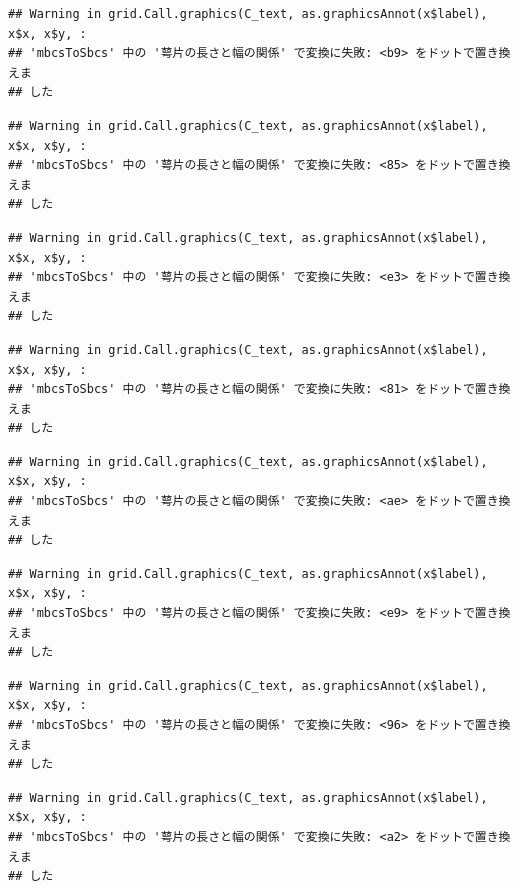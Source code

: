 \documentclass[
]{book}
\begin{document}
\begin{verbatim}
## Warning in grid.Call.graphics(C_text, as.graphicsAnnot(x$label), x$x, x$y, :
## 'mbcsToSbcs' 中の '萼片の長さと幅の関係' で変換に失敗: <b9> をドットで置き換えま
## した
\end{verbatim}

\begin{verbatim}
## Warning in grid.Call.graphics(C_text, as.graphicsAnnot(x$label), x$x, x$y, :
## 'mbcsToSbcs' 中の '萼片の長さと幅の関係' で変換に失敗: <85> をドットで置き換えま
## した
\end{verbatim}

\begin{verbatim}
## Warning in grid.Call.graphics(C_text, as.graphicsAnnot(x$label), x$x, x$y, :
## 'mbcsToSbcs' 中の '萼片の長さと幅の関係' で変換に失敗: <e3> をドットで置き換えま
## した
\end{verbatim}

\begin{verbatim}
## Warning in grid.Call.graphics(C_text, as.graphicsAnnot(x$label), x$x, x$y, :
## 'mbcsToSbcs' 中の '萼片の長さと幅の関係' で変換に失敗: <81> をドットで置き換えま
## した
\end{verbatim}

\begin{verbatim}
## Warning in grid.Call.graphics(C_text, as.graphicsAnnot(x$label), x$x, x$y, :
## 'mbcsToSbcs' 中の '萼片の長さと幅の関係' で変換に失敗: <ae> をドットで置き換えま
## した
\end{verbatim}

\begin{verbatim}
## Warning in grid.Call.graphics(C_text, as.graphicsAnnot(x$label), x$x, x$y, :
## 'mbcsToSbcs' 中の '萼片の長さと幅の関係' で変換に失敗: <e9> をドットで置き換えま
## した
\end{verbatim}

\begin{verbatim}
## Warning in grid.Call.graphics(C_text, as.graphicsAnnot(x$label), x$x, x$y, :
## 'mbcsToSbcs' 中の '萼片の長さと幅の関係' で変換に失敗: <96> をドットで置き換えま
## した
\end{verbatim}

\begin{verbatim}
## Warning in grid.Call.graphics(C_text, as.graphicsAnnot(x$label), x$x, x$y, :
## 'mbcsToSbcs' 中の '萼片の長さと幅の関係' で変換に失敗: <a2> をドットで置き換えま
## した
\end{verbatim}
\end{document}
